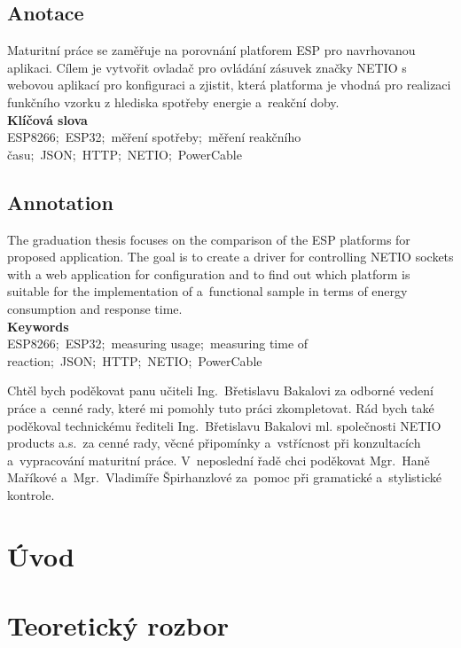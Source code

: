 \documentclass[a4paper, 12pt]{report}
\begin{document}
    \nocite{*}
    \renewcommand{\listingscaption}{Úryvek kódu}


    \titulniStrana
    \section*{Anotace}
    Maturitní práce se zaměřuje na porovnání platforem ESP pro navrhovanou aplikaci.
    Cílem je vytvořit ovladač pro ovládání zásuvek značky NETIO s webovou aplikací pro konfiguraci a zjistit, která platforma je vhodná pro realizaci funkčního vzorku z hlediska spotřeby energie a~reakční doby.\\
    \textbf{Klíčová slova}\\
    ESP8266;\ ESP32;\ měření spotřeby;\ měření reakčního času;\ JSON;\ HTTP;\ NETIO;\ PowerCable

    \section*{Annotation}
    The graduation thesis focuses on the comparison of the ESP platforms for proposed application.
    The goal is to create a driver for controlling NETIO sockets with a web application for configuration and to find out which platform is suitable for the implementation of a~functional sample in terms of energy consumption and response time.\\
    \textbf{Keywords}\\
    ESP8266;\ ESP32;\ measuring usage;\ measuring time of reaction;\ JSON;\ HTTP;\ NETIO;\ PowerCable

    \podekovani
    Chtěl bych poděkovat panu učiteli Ing.~Břetislavu Bakalovi za odborné vedení práce a~cenné rady, které mi pomohly tuto práci zkompletovat.
    Rád bych také poděkoval technickému řediteli Ing.~Břetislavu Bakalovi ml.
    společnosti NETIO products a.s.\ za cenné rady, věcné připomínky a~vstřícnost při konzultacích a~vypracování maturitní práce.
    V~neposlední řadě chci poděkovat Mgr.~Haně Maříkové a~Mgr.~Vladimíře Špirhanzlové za~pomoc při gramatické a~stylistické kontrole.
    \tableofcontents


    \chapter{Úvod}\label{ch:uvod}


    \chapter{Teoretický rozbor}\label{ch:teorie}
\end{document}
